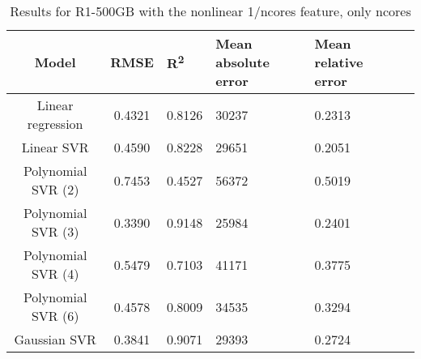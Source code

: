 \begin{table}[H]
\centering
\begin{adjustbox}{center}
\begin{tabular}{c | c M{1.2cm} M{2.5cm} M{2.5cm} M{1.8cm}}
Model & RMSE & R\textsuperscript{2} & Mean absolute error & Mean relative error \tabularnewline
\hline
Linear regression & 0.4321 & 0.8126 &  30237 & 0.2313 \\
Linear SVR & 0.4590 & 0.8228 &  29651 & 0.2051 \\
Polynomial SVR (2) & 0.7453 & 0.4527 &  56372 & 0.5019 \\
Polynomial SVR (3) & 0.3390 & 0.9148 &  25984 & 0.2401 \\
Polynomial SVR (4) & 0.5479 & 0.7103 &  41171 & 0.3775 \\
Polynomial SVR (6) & 0.4578 & 0.8009 &  34535 & 0.3294 \\
Gaussian SVR & 0.3841 & 0.9071 &  29393 & 0.2724 \\
\end{tabular}
\end{adjustbox}
\\
\caption{Results for R1-500GB with the nonlinear 1/ncores feature, only ncores}
\label{tab:all_nonlinear_R1_500}
\end{table}
